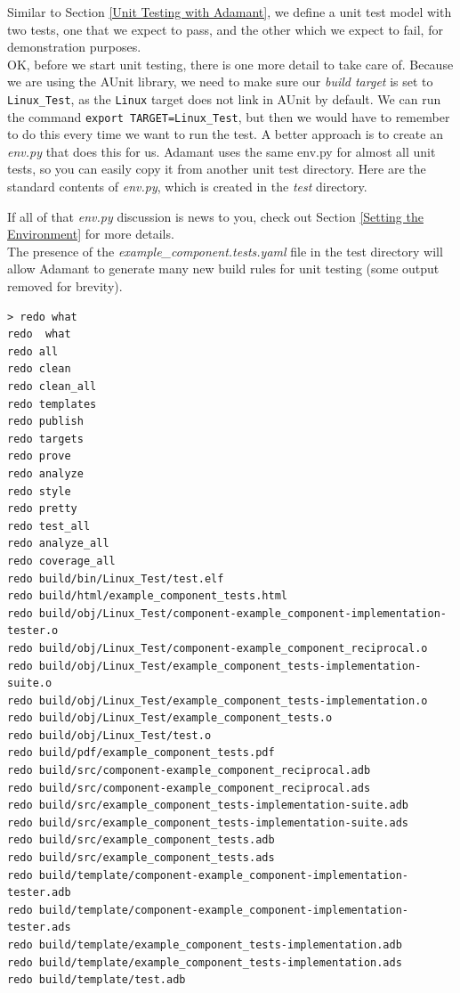 Similar to Section \ref{Unit Testing with Adamant}, we define a unit test model with two tests, one that we expect to pass, and the other which we expect to fail, for demonstration purposes. \\

OK, before we start unit testing, there is one more detail to take care of. Because we are using the AUnit library, we need to make sure our \textit{build target} is set to \texttt{Linux\_Test}, as the \texttt{Linux} target does not link in AUnit by default. We can run the command \texttt{export TARGET=Linux\_Test}, but then we would have to remember to do this every time we want to run the test. A better approach is to create an \textit{env.py} that does this for us. Adamant uses the same env.py for almost all unit tests, so you can easily copy it from another unit test directory. Here are the standard contents of \textit{env.py}, which is created in the \textit{test} directory.


If all of that \textit{env.py} discussion is news to you, check out Section \ref{Setting the Environment} for more details. \\

The presence of the \textit{example\_component.tests.yaml} file in the test directory will allow Adamant to generate many new build rules for unit testing (some output removed for brevity). \\

\vspace{5mm} %
\begin{verbatim}
> redo what
redo  what
redo all
redo clean
redo clean_all
redo templates
redo publish
redo targets
redo prove
redo analyze
redo style
redo pretty
redo test_all
redo analyze_all
redo coverage_all
redo build/bin/Linux_Test/test.elf
redo build/html/example_component_tests.html
redo build/obj/Linux_Test/component-example_component-implementation-tester.o
redo build/obj/Linux_Test/component-example_component_reciprocal.o
redo build/obj/Linux_Test/example_component_tests-implementation-suite.o
redo build/obj/Linux_Test/example_component_tests-implementation.o
redo build/obj/Linux_Test/example_component_tests.o
redo build/obj/Linux_Test/test.o
redo build/pdf/example_component_tests.pdf
redo build/src/component-example_component_reciprocal.adb
redo build/src/component-example_component_reciprocal.ads
redo build/src/example_component_tests-implementation-suite.adb
redo build/src/example_component_tests-implementation-suite.ads
redo build/src/example_component_tests.adb
redo build/src/example_component_tests.ads
redo build/template/component-example_component-implementation-tester.adb
redo build/template/component-example_component-implementation-tester.ads
redo build/template/example_component_tests-implementation.adb
redo build/template/example_component_tests-implementation.ads
redo build/template/test.adb
\end{verbatim}
\vspace{5mm} %

